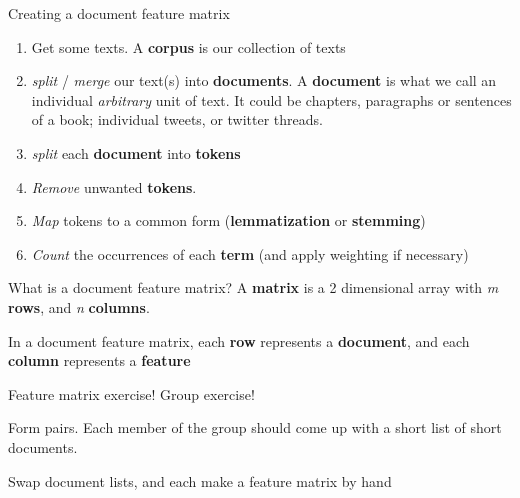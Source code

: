 \documentclass[
  10pt,
  ignorenonframetext,
  aspectratio=169]{beamer}
\begin{document}
\begin{frame}{Creating a document feature matrix}
\protect\hypertarget{creating-a-document-feature-matrix}{}
\begin{enumerate}
  \item<1-> Get some texts. A \textbf{corpus} is our collection of texts
  \item<2-> \textit{split} / \textit{merge} our text(s) into \textbf{documents}. A \textbf{document} is what we call an individual \textit{arbitrary} unit of text. It could be chapters, paragraphs or sentences of a book; individual tweets, or twitter threads. 
  \item<3-> \textit{split} each \textbf{document} into \textbf{tokens}
  \item<4-> \textit{Remove} unwanted \textbf{tokens}.
  \item<5-> \textit{Map} tokens to a common form (\textbf{lemmatization} or \textbf{stemming})
  \item<6-> \textit{Count} the occurrences of each \textbf{term} (and apply weighting if necessary)
\end{enumerate}

\end{frame}

\begin{frame}{What is a document feature matrix?}
\protect\hypertarget{what-is-a-document-feature-matrix}{}
A \textbf{matrix} is a 2 dimensional array with \emph{m} \textbf{rows},
and \emph{n} \textbf{columns}.

In a document feature matrix, each \textbf{row} represents a
\textbf{document}, and each \textbf{column} represents a
\textbf{feature}

\end{frame}

\begin{frame}{Feature matrix exercise!}
\protect\hypertarget{feature-matrix-exercise}{}
Group exercise!

Form pairs. Each member of the group should come up with a short list of
short documents.

Swap document lists, and each make a feature matrix by hand
\end{frame}
\end{document}
